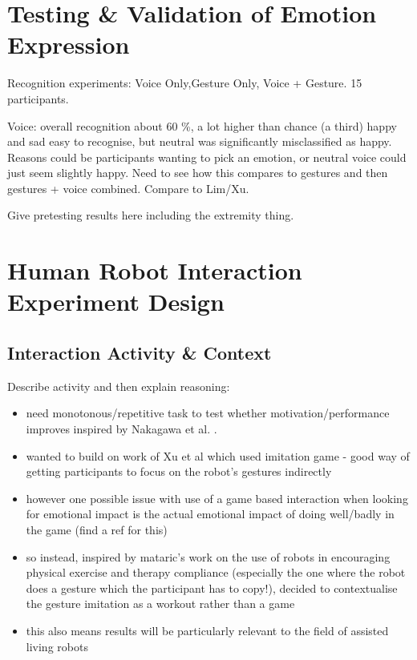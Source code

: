 \documentclass[11pt,a4paper]{report}
\begin{document}
\section{Testing \& Validation of Emotion Expression}
Recognition experiments: Voice Only,Gesture Only, Voice + Gesture. 15 participants.

Voice: overall recognition about 60 \%, a lot higher than chance (a third) happy and sad easy to recognise, but neutral was significantly misclassified as happy. Reasons could be participants wanting to pick an emotion, or neutral voice could just seem slightly happy. Need to see how this compares to gestures and then gestures + voice combined. Compare to Lim/Xu. 

Give pretesting results here including the extremity thing.

\section{Human Robot Interaction Experiment Design}
\subsection{Interaction Activity \& Context}

Describe activity and then explain reasoning:

\begin{itemize}
	\item need monotonous/repetitive task to test whether motivation/performance improves inspired by Nakagawa et al. \cite{nakagawa2011effect}.
	\item wanted to build on work of Xu et al which used imitation game - good way of getting participants to focus on the robot's gestures indirectly
	\item however one possible issue with use of a game based interaction when looking for emotional impact is the actual emotional impact of doing well/badly in the game (find a ref for this)
	\item so instead, inspired by mataric's work on the use of robots in encouraging physical exercise and therapy compliance (especially the one where the robot does a gesture which the participant has to copy!), decided to contextualise the gesture imitation as a workout rather than a game
	\item this also means results will be particularly relevant to the field of assisted living robots
\end{itemize}
\end{document}
